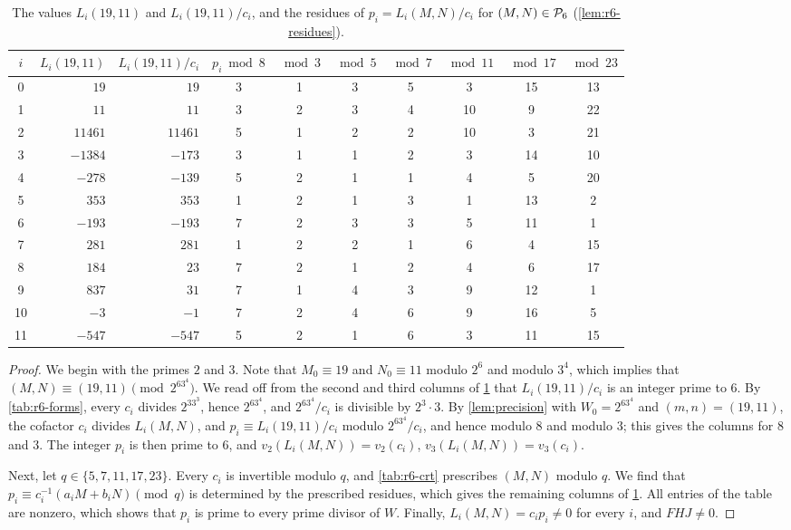 \begin{table}[htbp]
\centering
\caption{The values $L_i(19,11)$ and $L_i(19,11)/c_i$, and the residues of $p_i=L_i(M,N)/c_i$ for $(M,N)\in\mathcal P_6$ (\cref{lem:r6-residues}).}
\label{tab:r6-residues} \setlength{\tabcolsep}{4pt}
\begin{tabular}{crrccccccc}
\toprule
$i$ & $L_i(19,11)$ & $L_i(19,11)/c_i$ & $p_i\bmod8$ & $\bmod3$ & $\bmod5$ & $\bmod7$ & $\bmod11$ & $\bmod17$ & $\bmod23$\\
\midrule
0 & $19$ & $19$ & 3 & 1 & 3 & 5 & 3 & 15 & 13 \\
1 & $11$ & $11$ & 3 & 2 & 3 & 4 & 10 & 9 & 22 \\
2 & $11461$ & $11461$ & 5 & 1 & 2 & 2 & 10 & 3 & 21 \\
3 & $-1384$ & $-173$ & 3 & 1 & 1 & 2 & 3 & 14 & 10 \\
4 & $-278$ & $-139$ & 5 & 2 & 1 & 1 & 4 & 5 & 20 \\
5 & $353$ & $353$ & 1 & 2 & 1 & 3 & 1 & 13 & 2 \\
6 & $-193$ & $-193$ & 7 & 2 & 3 & 3 & 5 & 11 & 1 \\
7 & $281$ & $281$ & 1 & 2 & 2 & 1 & 6 & 4 & 15 \\
8 & $184$ & $23$ & 7 & 2 & 1 & 2 & 4 & 6 & 17 \\
9 & $837$ & $31$ & 7 & 1 & 4 & 3 & 9 & 12 & 1 \\
10 & $-3$ & $-1$ & 7 & 2 & 4 & 6 & 9 & 16 & 5 \\
11 & $-547$ & $-547$ & 5 & 2 & 1 & 6 & 3 & 11 & 15 \\
\bottomrule
\end{tabular}
\end{table}

\begin{proof}
We begin with the primes $2$ and $3$. Note that $M_0\equiv19$ and $N_0\equiv11$ modulo $2^6$ and modulo $3^4$, which implies that $(M,N)\equiv(19,11)\pmod{2^63^4}$. We read off from the second and third columns of \cref{tab:r6-residues} that $L_i(19,11)/c_i$ is an integer prime to $6$. By \cref{tab:r6-forms}, every $c_i$ divides $2^33^3$, hence $2^63^4$, and $2^63^4/c_i$ is divisible by $2^3\cdot3$. By \cref{lem:precision} with $W_0=2^63^4$ and $(m,n)=(19,11)$, the cofactor $c_i$ divides $L_i(M,N)$, and $p_i\equiv L_i(19,11)/c_i$ modulo $2^63^4/c_i$, and hence modulo $8$ and modulo $3$; this gives the columns for $8$ and $3$. The integer $p_i$ is then prime to $6$, and $v_2(L_i(M,N))=v_2(c_i)$, $v_3(L_i(M,N))=v_3(c_i)$.

Next, let $q\in\{5,7,11,17,23\}$. Every $c_i$ is invertible modulo $q$, and \cref{tab:r6-crt} prescribes $(M,N)$ modulo $q$. We find that $p_i\equiv c_i^{-1}(a_iM+b_iN)\pmod q$ is determined by the prescribed residues, which gives the remaining columns of \cref{tab:r6-residues}. All entries of the table are nonzero, which shows that $p_i$ is prime to every prime divisor of $W$. Finally, $L_i(M,N)=c_ip_i\ne0$ for every $i$, and $FHJ\ne0$.
\end{proof}

